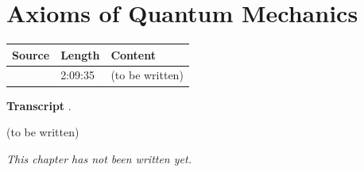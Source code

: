 \chapter{Axioms of Quantum Mechanics}\label{ch:c21}
\begin{paracol}{2}

\begin{sources}
\begin{tabularx}{\linewidth}{@{}l l L@{}}
\toprule
\textbf{Source} & \textbf{Length} & \textbf{Content}\\
\midrule
{} & 2:09:35 & (to be written)\\
\bottomrule
\end{tabularx}

\smallskip
\textbf{Transcript} .
\end{sources}

\begin{reading}
(to be written)
\end{reading}

\emph{This chapter has not been written yet.}

\flushside
\end{paracol}
